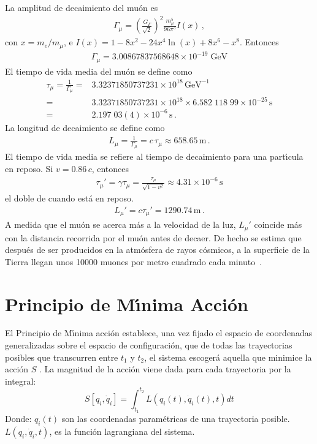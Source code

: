 \begin{example}
  La amplitud de decaimiento del mu\'on es
    \begin{align}
      \Gamma_\mu=\left(\frac{G_F}{\sqrt{2}}\right)^2\frac{m_\mu^5}{96\pi^3}I\left(x\right)\,,
    \end{align}
    con $x=m_e/m_\mu$, e $I(x)=1-8x^2-24x^4\ln(x)+8x^6-x^8$.
    Entonces
    \begin{align}
      \Gamma_\mu=3.00867837568648 \times 10^{- 19} \; \text{GeV}
    \end{align}
    El tiempo de vida media del mu\'on se define como
    \begin{align}
      \tau_\mu=\frac{1}{\Gamma_\mu}=&3.32371850737231\times10^{18}\,\text{GeV}^{-1}\nonumber\\
      =&3.32371850737231\times10^{18}\times6.582\;118\;99\times10^{-25}\,\text{s}\nonumber\\
      =&2.197\;03(4)\times10^{-6}\,\text{s}\,.
    \end{align}
La longitud de decaimiento se define como
\begin{align}
  L_\mu=\frac{1}{\Gamma_\mu}=c\,\tau_\mu\approx658.65\,\text{m}\,.
\end{align}
El tiempo de vida media se refiere al tiempo de decaimiento para una part\'\i cula en reposo. Si $v=0.86\,c$, entonces
\begin{align}
  \tau_\mu'=\gamma\tau_\mu=\frac{\tau_\mu}{\sqrt{1-v^2}}\approx4.31\times10^{-6}\,\text{s}
\end{align}
el doble de cuando est\'a en reposo. 
\begin{align}
  L_\mu'=c\tau_\mu'=1290.74\,\text{m}\,.
\end{align}
A medida que el mu\'on se acerca m\'as a la velocidad de la luz, $L_\mu'$ coincide m\'as con la distancia recorrida por el mu\'on antes de decaer. De hecho se estima que despu\'es de ser producidos en la atm\'osfera de rayos c\'osmicos, a la superficie de la Tierra llegan unos 10000 muones por metro cuadrado cada minuto~\cite{muon}.
\end{example}


\section{Principio de M\'\i nima Acci\'on}
\label{sec:la}

El Principio de M\'\i nima acci\'on establece, una vez fijado el espacio de
coordenadas generalizadas sobre el espacio de configuraci\'on, que de
todas las trayectorias posibles que transcurren entre $t_1$ y $t_2$,
el sistema escoger\'a aquella que minimice la acci\'on $S$
\cite{ActionPhysics}.  La magnitud de la acci\'on viene dada para cada
trayectoria por la integral:
\begin{equation}
  \label{eq:la}
   S\left[q_i,\dot{q}_i\right] = \int_{t_{1}}^{t_{2}} L(q_i(t), \dot{q}_i(t),t) dt
\end{equation}
Donde:
$q_i(t)$ son las coordenadas param\'etricas de una trayectoria posible.
$L(q_i,\dot{q}_i,t)$, es la funci\'on lagrangiana del sistema.



